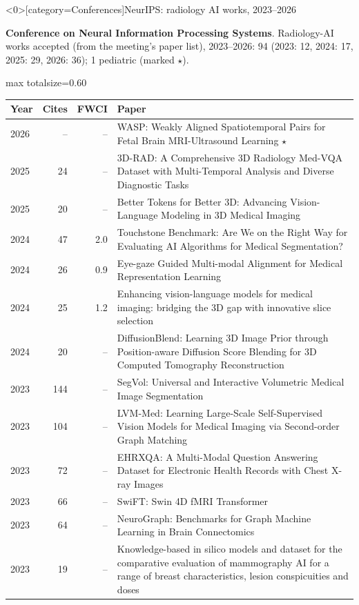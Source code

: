 \documentclass[aspectratio=169]{beamer}
\renewcommand{\arraystretch}{1.08}
\begin{document}
\begin{frame}<0>[category=Conferences]{NeurIPS: radiology AI works, 2023--2026}
{\scriptsize \textbf{Conference on Neural Information Processing Systems}. Radiology-AI works accepted (from the meeting's paper list), 2023--2026: 94 (2023: 12, 2024: 17, 2025: 29, 2026: 36); 1 pediatric (marked $\star$).\par}\vspace{2pt}
\tiny
\begin{adjustbox}{max totalsize={\textwidth}{0.60\textheight}}
\renewcommand{\arraystretch}{1.2}
\begin{tabular}{|l|r|r|>{\raggedright\arraybackslash}p{}|}
\hline \textbf{Year} & \textbf{Cites} & \textbf{FWCI} & \textbf{Paper} \\ \hline
2026 & -- & -- & WASP: Weakly Aligned Spatiotemporal Pairs for Fetal Brain MRI-Ultrasound Learning $\star$ \\ \hline
2025 & 24 & -- & 3D-RAD: A Comprehensive 3D Radiology Med-VQA Dataset with Multi-Temporal Analysis and Diverse Diagnostic Tasks \\ \hline
2025 & 20 & -- & Better Tokens for Better 3D: Advancing Vision-Language Modeling in 3D Medical Imaging \\ \hline
2024 & 47 & 2.0 & Touchstone Benchmark: Are We on the Right Way for Evaluating AI Algorithms for Medical Segmentation? \\ \hline
2024 & 26 & 0.9 & Eye-gaze Guided Multi-modal Alignment for Medical Representation Learning \\ \hline
2024 & 25 & 1.2 & Enhancing vision-language models for medical imaging: bridging the 3D gap with innovative slice selection \\ \hline
2024 & 20 & -- & DiffusionBlend: Learning 3D Image Prior through Position-aware Diffusion Score Blending for 3D Computed Tomography Reconstruction \\ \hline
2023 & 144 & -- & SegVol: Universal and Interactive Volumetric Medical Image Segmentation \\ \hline
2023 & 104 & -- & LVM-Med: Learning Large-Scale Self-Supervised Vision Models for Medical Imaging via Second-order Graph Matching \\ \hline
2023 & 72 & -- & EHRXQA: A Multi-Modal Question Answering Dataset for Electronic Health Records with Chest X-ray Images \\ \hline
2023 & 66 & -- & SwiFT: Swin 4D fMRI Transformer \\ \hline
2023 & 64 & -- & NeuroGraph: Benchmarks for Graph Machine Learning in Brain Connectomics \\ \hline
2023 & 19 & -- & Knowledge-based in silico models and dataset for the comparative evaluation of mammography AI for a range of breast characteristics, lesion conspicuities and doses \\ \hline
\end{tabular}
\end{adjustbox}
\\[2pt]
\end{frame}
\end{document}
